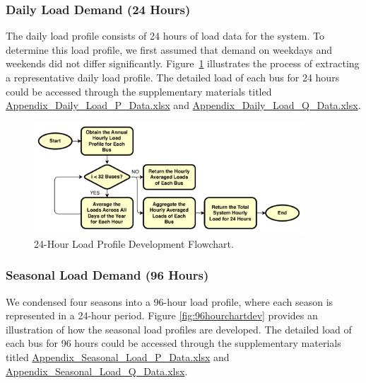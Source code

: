 \documentclass[12pt]{article}
\begin{document}
	\subsubsection{Daily Load Demand (24 Hours)}
	The daily load profile consists of 24 hours of load data for the system. To determine this load profile, we first assumed that demand on weekdays and weekends did not differ significantly. Figure~\ref{fig:24hourchartdev} illustrates the process of extracting a representative daily load profile. The detailed load of each bus for 24 hours could be accessed through the supplementary materials titled \href{https://docs.google.com/spreadsheets/d/1aUaok1M9MFdV-2YwGXDtjuIwCXB-yF1H/edit?usp=sharing&ouid=104271507204643812053&rtpof=true&sd=true}{Appendix\_Daily\_Load\_P\_Data.xlsx} and \href{https://docs.google.com/spreadsheets/d/1owMe5SsF_vXdNSdqBIJJ5x3NKYC_CiQ1/edit?usp=sharing&ouid=104271507204643812053&rtpof=true&sd=true}{Appendix\_Daily\_Load\_Q\_Data.xlsx}.
	
	
	\begin{figure}[htbp]
		\centerline{\includegraphics[width=0.9\textwidth]{dailychart.png}}
		\caption{24-Hour Load Profile Development Flowchart.}
		\label{fig:24hourchartdev}
	\end{figure}
	
	
	\subsubsection{Seasonal Load Demand (96 Hours)}
	We condensed four seasons into a 96-hour load profile, where each season is represented in a 24-hour period. Figure \ref{fig:96hourchartdev} provides an illustration of how the seasonal load profiles are developed. The detailed load of each bus for 96 hours could be accessed through the supplementary materials titled \href{https://docs.google.com/spreadsheets/d/1aUaok1M9MFdV-2YwGXDtjuIwCXB-yF1H/edit?usp=sharing&ouid=104271507204643812053&rtpof=true&sd=true}{Appendix\_Seasonal\_Load\_P\_Data.xlsx} and \href{https://docs.google.com/spreadsheets/d/12WRgx53A4gAkal306UHPLYaDwVpHLaF3/edit?usp=sharing&ouid=104271507204643812053&rtpof=true&sd=true}{Appendix\_Seasonal\_Load\_Q\_Data.xlsx}.
	
\end{document}
